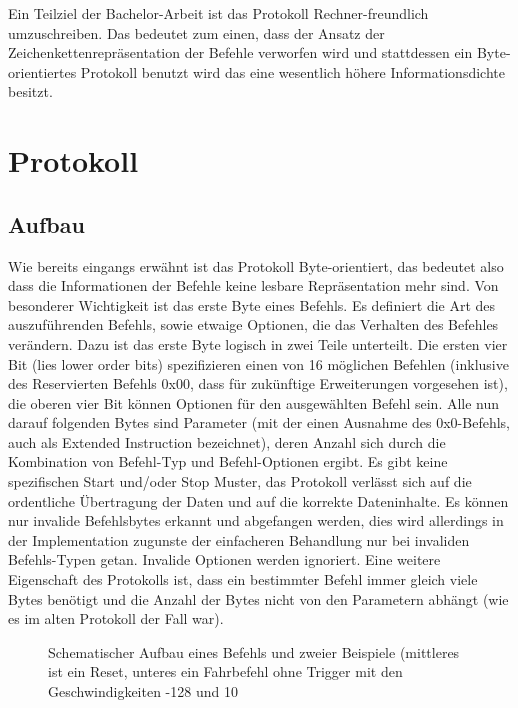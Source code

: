 \documentclass[a4paper]{article}
\begin{document}
	Ein Teilziel der Bachelor-Arbeit ist das Protokoll Rechner-freundlich umzuschreiben. Das bedeutet zum einen, dass der Ansatz der
	Zeichenkettenrepräsentation der Befehle verworfen wird und stattdessen ein Byte-orientiertes Protokoll benutzt wird das eine
	wesentlich höhere Informationsdichte besitzt.


	\section{Protokoll}

	\subsection{Aufbau}

	Wie bereits eingangs erwähnt ist das Protokoll Byte-orientiert, das bedeutet also dass die Informationen der Befehle keine
	lesbare Repräsentation mehr sind. Von besonderer Wichtigkeit ist das erste Byte eines Befehls. Es definiert die Art des
	auszuführenden Befehls, sowie etwaige Optionen, die das Verhalten des Befehles verändern. Dazu ist das erste Byte logisch
	in zwei Teile unterteilt. Die ersten vier Bit (lies lower order bits) spezifizieren einen von 16 möglichen Befehlen
	(inklusive des Reservierten Befehls 0x00, dass für zukünftige Erweiterungen vorgesehen ist), die oberen vier Bit können
	Optionen für den ausgewählten Befehl sein. Alle nun darauf folgenden Bytes sind Parameter (mit der einen Ausnahme des
	0x0-Befehls, auch als Extended Instruction bezeichnet), deren Anzahl sich durch die Kombination von Befehl-Typ und
	Befehl-Optionen ergibt.
	Es gibt keine spezifischen Start und/oder Stop Muster, das Protokoll verlässt sich auf die ordentliche Übertragung
	der Daten und auf die korrekte Dateninhalte. Es können nur invalide Befehlsbytes erkannt und abgefangen werden, dies wird
	allerdings in der Implementation zugunste der einfacheren Behandlung nur bei invaliden Befehls-Typen getan. Invalide
	Optionen werden ignoriert.
	Eine weitere Eigenschaft des Protokolls ist, dass ein bestimmter Befehl immer gleich viele Bytes benötigt und die Anzahl
	der Bytes nicht von den Parametern abhängt (wie es im alten Protokoll der Fall war).
	\begin{figure}[!ht]
		\centering
		\caption{Schematischer Aufbau eines Befehls und zweier Beispiele (mittleres ist ein Reset, unteres ein Fahrbefehl ohne
		Trigger mit den Geschwindigkeiten -128 und 10}
	\end{figure}
\end{document}
